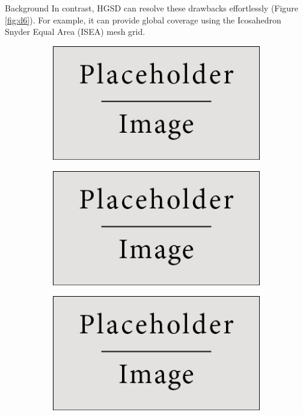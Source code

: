 \documentclass[final]{beamer}
\newlength{\onecolwid}
\begin{document}
\begin{frame}[t]
\begin{columns}[t]
\begin{column}{\onecolwid}
\begin{block}{Background}
        In contrast, HGSD can resolve these drawbacks effortlessly (Figure \ref{fig:d6}). For example, it can provide global coverage using the Icosahedron Snyder Equal Area (ISEA) mesh grid.
        \begin{figure}[H]
          \centering
          \begin{subfigure}[t]{0.3\textwidth}
            \centering
            \includegraphics[width=\linewidth]{figure/placeholder.jpg}
            \caption{}
            \label{fig:d4d8}
          \end{subfigure}
          \begin{subfigure}[t]{0.3\textwidth}
            \centering
            \includegraphics[width=\linewidth]{figure/placeholder.jpg}
            \caption{}
            \label{fig:island}
          \end{subfigure}
          \begin{subfigure}[t]{0.3\textwidth}
            \centering
            \includegraphics[width=\linewidth]{figure/placeholder.jpg}

\end{subfigure}
\end{figure}
\end{block}
\end{column}
\end{columns}
\end{frame}
\end{document}

